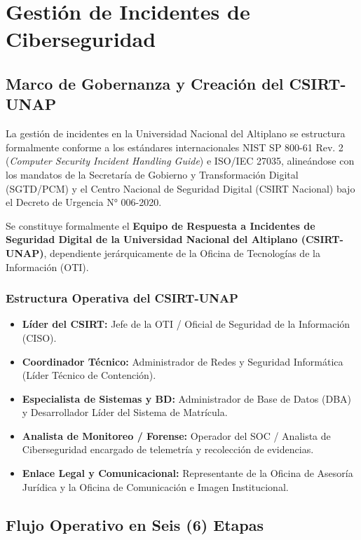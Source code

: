 \chapter{Gestión de Incidentes de Ciberseguridad}
\label{ch:gestion_incidentes}

\section{Marco de Gobernanza y Creación del CSIRT-UNAP}

La gestión de incidentes en la Universidad Nacional del Altiplano se estructura formalmente conforme a los estándares internacionales NIST SP 800-61 Rev. 2 (\textit{Computer Security Incident Handling Guide}) e ISO/IEC 27035, alineándose con los mandatos de la Secretaría de Gobierno y Transformación Digital (SGTD/PCM) y el Centro Nacional de Seguridad Digital (CSIRT Nacional) bajo el Decreto de Urgencia N° 006-2020.

Se constituye formalmente el \textbf{Equipo de Respuesta a Incidentes de Seguridad Digital de la Universidad Nacional del Altiplano (CSIRT-UNAP)}, dependiente jerárquicamente de la Oficina de Tecnologías de la Información (OTI).

\subsection*{Estructura Operativa del CSIRT-UNAP}

\begin{itemize}
    \item \textbf{Líder del CSIRT:} Jefe de la OTI / Oficial de Seguridad de la Información (CISO).
    \item \textbf{Coordinador Técnico:} Administrador de Redes y Seguridad Informática (Líder Técnico de Contención).
    \item \textbf{Especialista de Sistemas y BD:} Administrador de Base de Datos (DBA) y Desarrollador Líder del Sistema de Matrícula.
    \item \textbf{Analista de Monitoreo / Forense:} Operador del SOC / Analista de Ciberseguridad encargado de telemetría y recolección de evidencias.
    \item \textbf{Enlace Legal y Comunicacional:} Representante de la Oficina de Asesoría Jurídica y la Oficina de Comunicación e Imagen Institucional.
\end{itemize}

\section{Flujo Operativo en Seis (6) Etapas}

